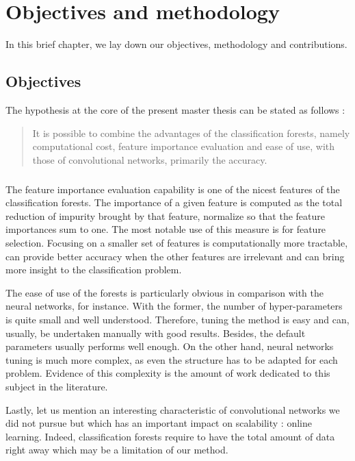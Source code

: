 \documentclass[a4paper]{report}
\begin{document}
\chapter{Objectives and methodology}
In this brief chapter, we lay down our objectives, methodology and contributions.

\section{Objectives}
The hypothesis at the core of the present master thesis can be stated as follows : 
\begin{quote}
It is possible to combine the advantages of the classification forests, namely computational cost, feature importance evaluation and ease of use, with those of convolutional networks, primarily the accuracy.
\end{quote}
\paragraph{}
The feature importance evaluation capability is one of the nicest features of the classification forests. The importance of a given feature is computed as the total reduction of impurity brought by that feature, normalize so that the feature importances sum to one. The most notable use of this measure is for feature selection. Focusing on a smaller set of features is computationally more tractable, can provide better accuracy when the other features are irrelevant and can bring more insight to the classification problem.
\par
The ease of use of the forests is particularly obvious in comparison with the neural networks, for instance. With the former, the number of hyper-parameters is quite small and well understood. Therefore, tuning the method is easy and can, usually, be undertaken manually with good results. Besides, the default parameters usually performs well enough. On the other hand, neural networks tuning is much more complex, as even the structure has to be adapted for each problem. Evidence of this complexity is the amount of work dedicated to this subject in the literature. %
\par
Lastly, let us mention an interesting characteristic of convolutional networks we did not pursue but which has an important impact on scalability : online learning. Indeed, classification forests require to have the total amount of data right away which may be a limitation of our method.
\end{document}
